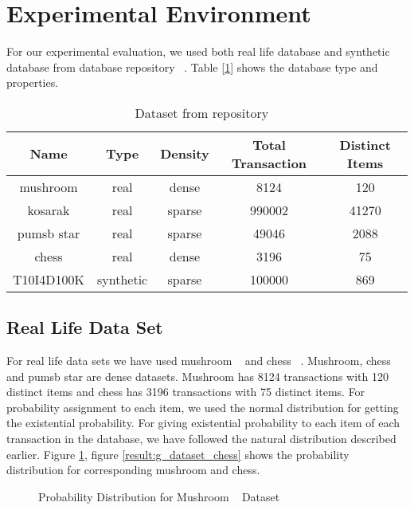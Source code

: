 \section{Experimental Environment}
For our experimental evaluation, we used both real life database and synthetic database from database repository ~\cite{dataset}. Table [\ref{table:dataset}] shows the database type and properties.
        \begin{table}[h]
        \centering
        \begin{tabular}{|c|c|c|c|c|}
        \hline 
        Name        &    Type    &    Density    &    Total Transaction     &    Distinct Items    \\ \hline \hline
        mushroom    &    real    &    dense    &    8124    &    120                            \\ \hline
        kosarak        &    real    &    sparse    &    990002    &    41270                        \\ \hline
        pumsb star    &    real    &    sparse    &    49046    &    2088                        \\ \hline
        chess        &    real    &    dense    &    3196    &    75                            \\ \hline
        T10I4D100K    &    synthetic    &    sparse    &    100000    &    869                        \\ \hline
            \end{tabular}
        \caption{Dataset from repository ~\cite{dataset}}
        \label{table:dataset}
        \end{table}


\subsection{Real Life Data Set}
For real life data sets we have used mushroom ~\cite{dataset} and chess ~\cite{dataset}. Mushroom, chess and pumsb star are dense datasets. Mushroom has 8124 transactions with 120 distinct items and chess has 3196 transactions with 75 distinct items. For probability assignment to each item, we used the normal distribution for getting the existential probability. For giving existential probability to each item of each transaction in the database, we have followed the natural distribution described earlier. Figure \ref{result:g_dataset_mushroom}, figure \ref{result:g_dataset_chess} shows the probability distribution for corresponding mushroom and chess.
        \begin{figure}[h]
        \centering
            
        \caption{Probability Distribution for Mushroom ~\cite{dataset} Dataset}
        \label{result:g_dataset_mushroom}
        \end{figure}
        
